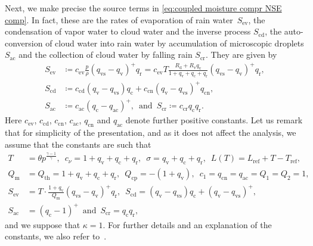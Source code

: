 \documentclass[10pt]{amsart}
\theoremstyle{plain}
\theoremstyle{definition}
\theoremstyle{thm}
\numberwithin{equation}{section}
\newcommand{\tand}{\enspace \text{and} \enspace}
\newcommand{\rd}{\mathrm{d}}
\renewcommand{\rm}{\mathrm{m}}
\newcommand{\rr}{\mathrm{r}}
\newcommand{\rv}{\mathrm{v}}
\newcommand{\rvs}{\mathrm{vs}}
\newcommand{\rc}{\mathrm{c}}
\newcommand{\rev}{\mathrm{ev}}
\newcommand{\rcd}{\mathrm{cd}}
\newcommand{\rac}{\mathrm{ac}}
\newcommand{\rcr}{\mathrm{cr}}
\newcommand{\rth}{\mathrm{th}}
\newcommand{\rcp}{\mathrm{cp}}
\newcommand{\rref}{\mathrm{ref}}
\newcommand{\rcn}{\mathrm{cn}}
\begin{document}
Next, we make precise the source terms in \eqref{eq:coupled moisture compr NSE comp}.
In fact, these are the rates of evaporation of rain water~$S_\rev$, the condensation of vapor water to cloud water and the inverse process $S_\rcd$, the auto-conversion of cloud water into rain water by accumulation of microscopic droplets $S_\rac$ and the collection of cloud water by falling rain $S_\rcr$.
They are given by
\begin{equation*}
    \begin{aligned}
        S_\rev
        &\coloneqq c_\rev \frac{p}{\rho}(q_\rvs - q_\rv)^+ q_\rr = c_\rev T \frac{R_\rd + R_\rv q_\rv}{1 + q_\rv + q_\rc + q_\rr}(q_\rvs - q_\rv)^+ q_\rr,\\
        S_\rcd
        &\coloneqq c_\rcd(q_\rv - q_\rvs) q_\rc + c_\rcn(q_\rv - q_\rvs)^+ q_\rcn,\\
        S_\rac
        &\coloneqq c_\rac(q_\rc - q_\rac)^+, \tand S_\rcr \coloneqq c_\rcr q_\rc q_\rr.
    \end{aligned}
\end{equation*}
Here $c_\rev$, $c_\rcd$, $c_\rcn$, $c_\rac$, $q_\rcn$ and $q_\rac$ denote further positive constants.
Let us remark that for simplicity of the presentation, and as it does not affect the analysis, we assume that the constants are such that
\begin{equation*}
    \begin{aligned}
        T
        &= \theta p^{\frac{\gamma-1}{\gamma}}, \enspace c_\nu = 1 + q_\rv + q_\rc + q_\rr, \enspace \sigma = q_\rv + q_\rc + q_\rr, \enspace L(T) = L_\rref + T - T_\rref,\\
        Q_\rm 
        &= Q_\rth = 1 + q_\rv + q_\rc + q_\rr, \enspace Q_\rcp = -(1 + q_\rv), \enspace c_1 = q_\rcn = q_\rac = Q_1 = Q_2 = 1,\\
        S_\rev
        &= T \cdot \frac{1 + q_\rv}{Q_\rm}(q_\rvs - q_\rv)^+ q_\rr, \enspace S_\rcd = (q_\rv - q_\rvs) q_\rc + (q_\rv - q_\rvs)^+,\\
        S_\rac 
        &= (q_\rc - 1)^+ \tand S_\rcr = q_\rc q_\rr,
    \end{aligned}
\end{equation*}
and we suppose that $\kappa = 1$.
For further details and an explanation of the constants, we also refer to~\cite[Sec.~1]{DKLT:24}.
\end{document}
